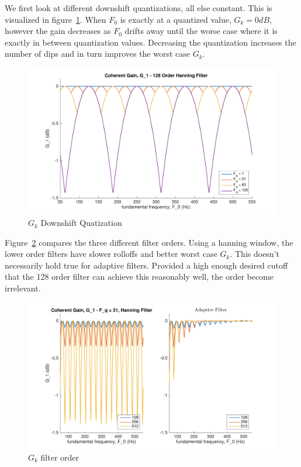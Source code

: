 \documentclass [11pt, proquest] {uwthesis}[2015/03/03]
\begin{document}
We first look at different downshift quantizations, all else constant.  This is visualized in figure~\ref{fig:g_k_1}.  When $F_0$ is exactly at a quantized value, $G_k = 0dB$, however the gain decreases as $F_0$ drifts away until the worse case where it is exactly in between quantization values.  Decreasing the quantization increases the number of dips and in turn improves the worst case $G_k$.

\begin{figure}[!ht]
  \centering
    \includegraphics[width=1\textwidth]{g_k_1}   
    \caption{$G_k$ Downshift Quatization}\label{fig:g_k_1}
\end{figure}

Figure~\ref{fig:g_k_2} compares the three different filter orders.  Using a hanning window, the lower order filters have slower rolloffs and better worst case $G_k$.  This doesn't necessarily hold true for adaptive filters.  Provided a high enough desired cutoff that the 128 order filter can achieve this reasonably well, the order become irrelevant.

\begin{figure}[!ht]
  \centering
    \includegraphics[width=1\textwidth]{g_k_2}   
    \caption{$G_k$ filter order}\label{fig:g_k_2}
\end{figure}
\end{document}

